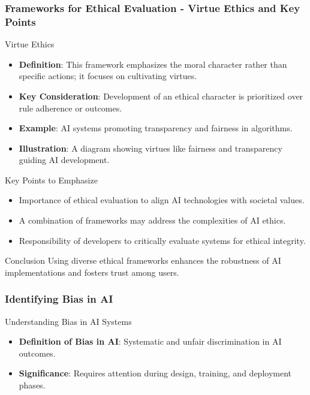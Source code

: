 \documentclass{beamer}
\begin{document}
\begin{frame}[fragile]
    \frametitle{Frameworks for Ethical Evaluation - Virtue Ethics and Key Points}
    
    \begin{block}{Virtue Ethics}
        \begin{itemize}
            \item \textbf{Definition}: This framework emphasizes the moral character rather than specific actions; it focuses on cultivating virtues.
            \item \textbf{Key Consideration}: Development of an ethical character is prioritized over rule adherence or outcomes.
            \item \textbf{Example}: AI systems promoting transparency and fairness in algorithms.
            \item \textbf{Illustration}: A diagram showing virtues like fairness and transparency guiding AI development.
        \end{itemize}
    \end{block}
    
    \begin{block}{Key Points to Emphasize}
        \begin{itemize}
            \item Importance of ethical evaluation to align AI technologies with societal values.
            \item A combination of frameworks may address the complexities of AI ethics.
            \item Responsibility of developers to critically evaluate systems for ethical integrity.
        \end{itemize}
    \end{block}
    
    \begin{block}{Conclusion}
        Using diverse ethical frameworks enhances the robustness of AI implementations and fosters trust among users.
    \end{block}
\end{frame}

\begin{frame}[fragile]
    \frametitle{Identifying Bias in AI}
    \begin{block}{Understanding Bias in AI Systems}
        \begin{itemize}
            \item \textbf{Definition of Bias in AI}: Systematic and unfair discrimination in AI outcomes.
            \item \textbf{Significance}: Requires attention during design, training, and deployment phases.
        \end{itemize}
    \end{block}
\end{frame}
\end{document}
